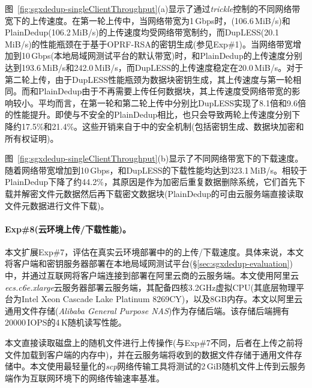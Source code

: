 图~\ref{fig:sgxdedup-singleClientThroughput}(a)显示了通过\textit{trickle}\cite{eriksen05}控制的不同网络带宽下的上传速度。在第一轮上传中，当网络带宽为1\,Gbps时，\sysnameS (106.6\,MiB/s)和PlainDedup(106.2\,MiB/s)的上传速度均受网络带宽制约，而DupLESS(20.1\,MiB/s)的性能瓶颈在于基于OPRF-RSA的密钥生成(参见Exp\#1)。当网络带宽增加到10\,Gbps(本地局域网测试平台的默认带宽)时，\sysnameS 和PlainDedup的上传速度分别达到193.6\,MiB/s和242.0\,MiB/s，而DupLESS的上传速度稳定在20.0\,MiB/s。对于第二轮上传，由于DupLESS性能瓶颈为数据块密钥生成，其上传速度与第一轮相同。而\sysnameS 和PlainDedup由于不再需要上传任何数据块，其上传速度受网络带宽的影响较小。平均而言，\sysnameS 在第一轮和第二轮上传中分别比DupLESS实现了8.1倍和9.6倍的性能提升。即使与不安全的PlainDedup相比，\sysnameS 也只会导致两轮上传速度分别下降约17.5\%和21.4\%。这些开销来自于\sysnameS 中的安全机制(包括密钥生成、数据块加密和所有权证明)。

图~\ref{fig:sgxdedup-singleClientThroughput}(b)显示了不同网络带宽下的下载速度。随着网络带宽增加到10\,Gbps，\sysnameS 和DupLESS的下载性能均达到323.1\,MiB/s。相较于PlainDedup下降了约44.2\%，其原因是作为加密后重复数据删除系统，它们首先下载并解密文件元数据然后再下载密文数据块(PlainDedup的可由云服务端直接读取文件元数据进行文件下载)。

\paragraph*{Exp\#8(云环境上传/下载性能)。}本文扩展Exp\#7，评估在真实云环境部署中的\sysnameS 的上传/下载速度。具体来说，本文将客户端和密钥服务器部署在本地局域网测试平台(\S\ref{sec:sgxdedup-evaluation})中，并通过互联网将客户端连接到部署在阿里云商的云服务端。本文使用阿里云\textit{ecs.c6e.xlarge}云服务器部署云服务端，其配备四核3.2GHz虚拟CPU(其底层物理平台为Intel Xeon Cascade Lake Platinum 8269CY)，以及8GB内存。本文以阿里云通用文件存储(\textit{Alibaba General Purpose NAS})作为存储后端。该存储后端拥有20000\,IOPS的4\,K随机读写性能。

本文直接读取磁盘上的随机文件进行上传操作(与Exp\#7不同，后者在上传之前将文件加载到客户端的内存中)，并在云服务端将收到的数据文件存储于通用文件存储中。本文使用最轻量化的\textit{scp}网络传输工具将测试的2\,GiB随机文件上传到云服务端作为互联网环境下的网络传输速率基准。

